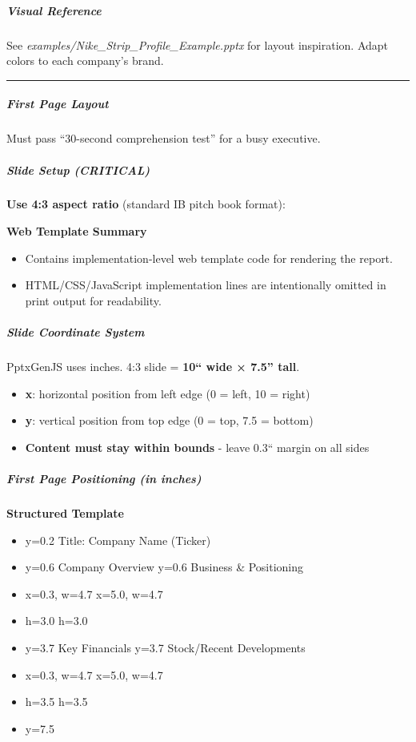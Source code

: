 \documentclass[11pt]{article}
\begin{document}
\subparagraph{Visual Reference}\mbox{}\par
See \emph{examples/Nike\_\allowbreak{}Strip\_\allowbreak{}Profile\_\allowbreak{}Example.pptx} for layout inspiration. Adapt colors to each company's brand.


\vspace{0.5em}\hrule\vspace{0.5em}

\subparagraph{First Page Layout}\mbox{}\par

Must pass ``30-second comprehension test'' for a busy executive.


\subparagraph{Slide Setup (CRITICAL)}\mbox{}\par
\textbf{Use 4:3 aspect ratio} (standard IB pitch book format):

\textbf{Web Template Summary}
\begin{itemize}[leftmargin=*,itemsep=2pt,topsep=2pt]
\item {} Contains implementation-level web template code for rendering the report.
\item {} HTML/CSS/JavaScript implementation lines are intentionally omitted in print output for readability.
\end{itemize}

\subparagraph{Slide Coordinate System}\mbox{}\par
PptxGenJS uses inches. 4:3 slide = \textbf{10`` wide × 7.5'' tall}.

\begin{itemize}[leftmargin=*,itemsep=2pt,topsep=2pt]
\item {} \textbf{x}: horizontal position from left edge (0 = left, 10 = right)
\item {} \textbf{y}: vertical position from top edge (0 = top, 7.5 = bottom)
\item {} \textbf{Content must stay within bounds} - leave 0.3`` margin on all sides
\end{itemize}

\subparagraph{First Page Positioning (in inches)}\mbox{}\par
\textbf{Structured Template}
\begin{itemize}[leftmargin=*,itemsep=2pt,topsep=2pt]
\item {} y=0.2 Title: Company Name (Ticker)
\item {} y=0.6 Company Overview y=0.6 Business \& Positioning
\item {} x=0.3, w=4.7 x=5.0, w=4.7
\item {} h=3.0 h=3.0
\item {} y=3.7 Key Financials y=3.7 Stock/Recent Developments
\item {} x=0.3, w=4.7 x=5.0, w=4.7
\item {} h=3.5 h=3.5
\item {} y=7.5
\end{itemize}
\end{document}
